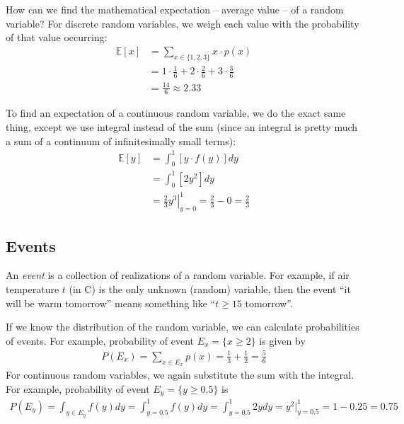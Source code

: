 \documentclass{article}
\begin{document}
How can we find the mathematical expectation -- average value -- of a random variable? For discrete random variables, we weigh each value with the probability of that value occurring:
\begin{align*}
	\mathbb{E}[x] &= \sum_{x \in \{1,2,3\}} x \cdot p(x)
	\\
	&= 1 \cdot \frac{1}{6} + 2 \cdot \frac{2}{6} + 3 \cdot \frac{3}{6}
	\\
	&= \frac{14}{6} \approx 2.33
\end{align*}

To find an expectation of a continuous random variable, we do the exact same thing, except we use integral instead of the sum (since an integral is pretty much a sum of a continuum of infinitesimally small terms):
\begin{align*}
	\mathbb{E}[y] &= \int_0^1 \left[y \cdot f(y)\right] dy
	\\
	&= \int_0^1 \left[2y^2 \right] dy
	\\
	&= \left. \frac{2}{3} y^3 \right|_{y=0}^{1} = \frac{2}{3} - 0 = \frac{2}{3}
\end{align*}


\subsection{Events}

An \emph{event} is a collection of realizations of a random variable. For example, if air temperature $t$ (in C) is the only unknown (random) variable, then the event ``it will be warm tomorrow'' means something like ``$t \geq 15$ tomorrow''.

If we know the distribution of the random variable, we can calculate probabilities of events. For example, probability of event $E_x = \{x \geq 2\}$ is given by
\begin{align*}
	P(E_x) = \sum_{x \in E_x} p(x) = \frac{1}{3} + \frac{1}{2} = \frac{5}{6}
\end{align*}
For continuous random variables, we again substitute the sum with the integral. For example, probability of event $E_y = \{y \geq 0.5\}$ is
\begin{align*}
	P(E_y) = \int_{y \in E_y} f(y) dy = \int_{y=0.5}^1 f(y) dy  = \int_{y=0.5}^1 2y dy = y^2 |_{y=0.5}^1 = 1 - 0.25 = 0.75
\end{align*}
\end{document}
